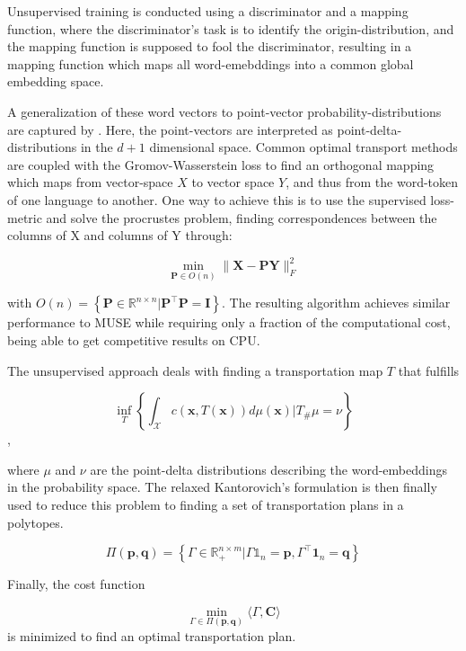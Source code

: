 \documentclass[a4paper,12pt,oneside,openright]{report}
\begin{document}
Unsupervised training is conducted using a discriminator and a mapping function, where the discriminator's task is to identify the origin-distribution, and the mapping function is supposed to fool the discriminator, resulting in a mapping function which maps all word-emebddings into a common global embedding space.

A generalization of these word vectors to point-vector probability-distributions are captured by \cite{alvarez18}.
Here, the point-vectors are interpreted as point-delta-distributions in the $d+1$ dimensional space.
Common optimal transport methods are coupled with the Gromov-Wasserstein loss to find an orthogonal mapping which maps from vector-space $X$ to vector space $Y$, and thus from the word-token of one language to another.
One way to achieve this is to use the supervised loss-metric and solve the procrustes problem, finding correspondences between the columns of X and columns of Y through:

\begin{equation}
\min _{\mathbf{P} \in O(n)}\|\mathbf{X}-\mathbf{P} \mathbf{Y}\|_{F}^{2}
\end{equation}

with $O(n)=\left\{\mathbf{P} \in \mathbb{R}^{n \times n} | \mathbf{P}^{\top} \mathbf{P}=\mathbf{I}\right\}$.
The resulting algorithm achieves similar performance to MUSE while requiring only a fraction of the computational cost, being able to get competitive results on CPU.

The unsupervised approach deals with finding a transportation map $T$ that fulfills

\begin{equation}
\inf _{T}\left\{\int_{\mathcal{X}} c(\mathbf{x}, T(\mathbf{x})) d \mu(\mathbf{x}) | T_{\#} \mu=\nu\right\}
\end{equation},

where $\mu$ and $\nu$ are the point-delta distributions describing the word-embeddings in the probability space.
The relaxed Kantorovich's formulation is then finally used to reduce this problem to finding a set of transportation plans in a polytopes.

$$
\Pi(\mathbf{p}, \mathbf{q})=\left\{\Gamma \in \mathbb{R}_{+}^{n \times m} | \Gamma \mathbb{1}_{n}=\mathbf{p}, \Gamma^{\top} \mathbf{1}_{n}=\mathbf{q}\right\}
$$

Finally, the cost function

$$
\min _{\Gamma \in \Pi(\mathbf{p}, \mathbf{q})}\langle\Gamma, \mathbf{C}\rangle
$$
is minimized to find an optimal transportation plan.
\end{document}

